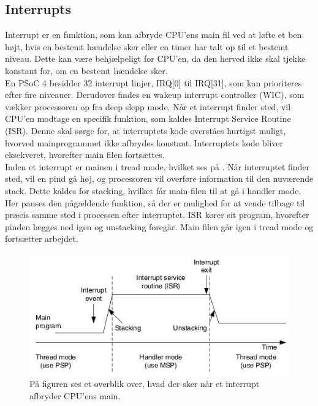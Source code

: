 \subsection{Interrupts}
Interrupt er en funktion, som kan afbryde CPU'ens main fil ved at løfte et ben højt, hvis en bestemt hændelse sker eller en timer har talt op til et bestemt niveau. Dette kan være behjælpeligt for CPU'en, da den herved ikke skal tjekke konstant for, om en bestemt hændelse sker. \citep{Badiger2016} \\
En PSoC 4 besidder 32 interrupt linjer, IRQ[0] til IRQ[31], som kan prioriteres efter fire niveauer. Derudover findes en wakeup interrupt controller (WIC), som vækker processoren op fra deep slepp mode. Når et interrupt finder sted, vil CPU'en modtage en specifik funktion, som kaldes Interrupt Service Routine (ISR). Denne skal sørge for, at interruptets kode overståes hurtigst muligt, hvorved mainprogrammet ikke afbrydes konstant. Interruptets kode bliver eksekveret, hvorefter main filen fortsættes. \citep{Badiger2016}\\
Inden et interrupt er mainen i tread mode, hvilket ses på . Når interruptet finder sted, vil en pind gå høj, og processoren vil overføre information til den nuværende stack. Dette kaldes for stacking, hvilket får main filen til at gå i handler mode. Her pauses den pågældende funktion, så der er mulighed for at vende tilbage til præcis samme sted i processen efter interruptet. ISR kører sit program, hvorefter pinden lægges ned igen og unstacking foregår. Main filen går igen i tread mode og fortsætter arbejdet. \citep{Badiger2016,Tanenbaum2006}
\begin{figure}[H]
	\centering
	\includegraphics[scale=0.68]{figures/bProblemloesning/interrupt.png}
	\caption{På figuren ses et overblik over, hvad der sker når et interrupt afbryder CPU'ens main. \citep{Tanenbaum2006}}
	\label{fig:interrupt}
\end{figure}\vspace{-0.5cm}
